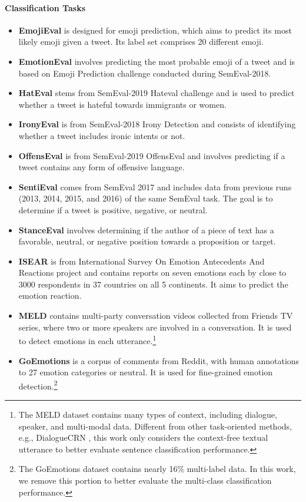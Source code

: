 \documentclass[letterpaper]{article} %
\begin{document}
\paragraph{Classification Tasks}
\begin{itemize}
\item
\textbf{EmojiEval} \cite{DBLP:conf/semeval/BarbieriCRABBPS18} is designed for emoji prediction, which aims to predict its most likely emoji given a tweet. Its label set comprises 20 different emoji.
\item
\textbf{EmotionEval} \cite{DBLP:conf/semeval/MohammadBSK18} involves predicting the most probable emoji of a tweet and is based on Emoji Prediction challenge conducted during SemEval-2018.
\item \textbf{HatEval} \cite{DBLP:conf/semeval/BasileBFNPPRS19} stems from SemEval-2019 Hateval challenge and is used to predict whether a tweet is hateful towards immigrants or women.
\item
\textbf{IronyEval} \cite{DBLP:conf/semeval/HeeLH18} is from SemEval-2018 Irony Detection and consists of identifying whether a tweet includes ironic intents or not.
    \item
\textbf{OffensEval} \cite{DBLP:conf/semeval/ZampieriMNRFK19} is from SemEval-2019 OffensEval and involves predicting if a tweet contains any form of offensive language.
    \item
\textbf{SentiEval} \cite{DBLP:conf/semeval/RosenthalRNS14} comes from SemEval 2017 and includes data from previous runs (2013,
2014, 2015, and 2016) of the same SemEval task. The goal is to determine if a tweet is positive, negative, or neutral.
    \item
\textbf{StanceEval} \cite{DBLP:conf/semeval/MohammadKSZC16} involves determining if the author of a piece of text has a favorable, neutral, or negative position towards a proposition or target.
    \item
\textbf{ISEAR} \cite{scherer1994evidence} is from International Survey On Emotion Antecedents And Reactions project and contains reports on seven emotions each by close to 3000 respondents in 37 countries on all 5 continents.
It aims to predict the emotion reaction.
    \item
\textbf{MELD} \cite{DBLP:conf/acl/PoriaHMNCM19} contains multi-party conversation videos collected from Friends TV series, where two or more speakers are involved in a conversation.  It is used to detect emotions in each utterance.\footnote{The MELD dataset contains many types of context, including dialogue, speaker, and multi-modal data. Different from other task-oriented methods, e.g., DialogueCRN \cite{DBLP:conf/acl/HuWH20}, this work only considers the context-free textual utterance to better evaluate sentence classification performance.}
    \item
\textbf{GoEmotions} \cite{DBLP:conf/acl/DemszkyMKCNR20} is a corpus of comments from Reddit, with human annotations to 27 emotion categories or neutral. It is used for fine-grained emotion detection.\footnote{The GoEmotions dataset contains nearly 16\% multi-label data. In this work, we remove this portion to better evaluate the multi-class classification performance.}
\end{itemize}
\end{document}
